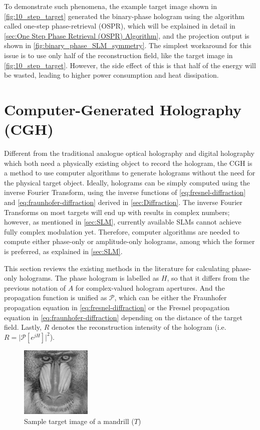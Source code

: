 To demonstrate such phenomena, the example target image shown in \cref{fig:10_step_target} generated the binary-phase hologram using the algorithm called one-step phase-retrieval (OSPR), which will be explained in detail in \cref{sec:One Step Phase Retrieval (OSPR) Algorithm}, and the projection output is shown in \cref{fig:binary_phase_SLM_symmetry}. The simplest workaround for this issue is to use only half of the reconstruction field, like the target image in \cref{fig:10_step_target}. However, the side effect of this is that half of the energy will be wasted, leading to higher power consumption and heat dissipation.



\newpage
\section{Computer-Generated Holography (CGH)}\label{sec:cgh}
Different from the traditional analogue optical holography and digital holography which both need a physically existing object to record the hologram, the CGH is a method to use computer algorithms to generate holograms without the need for the physical target object. Ideally, holograms can be simply computed using the inverse Fourier Transform, using the inverse functions of \cref{eq:fresnel-diffraction} and \cref{eq:fraunhofer-diffraction} derived in \cref{sec:Diffraction}. The inverse Fourier Transforms on most targets will end up with results in complex numbers; however, as mentioned in \cref{sec:SLM}, currently available SLMs cannot achieve fully complex modulation yet. Therefore, computer algorithms are needed to compute either phase-only or amplitude-only holograms, among which the former is preferred, as explained in \cref{sec:SLM}.

This section reviews the existing methods in the literature for calculating phase-only holograms. The phase hologram is labelled as $H$, so that it differs from the previous notation of $A$ for complex-valued hologram apertures. And the propagation function is unified as $\mathcal{P}$, which can be either the Fraunhofer propagation equation in \cref{eq:fresnel-diffraction} or the Fresnel propagation equation in \cref{eq:fraunhofer-diffraction} depending on the distance of the target field. Lastly, $R$ denotes the reconstruction intensity of the hologram (i.e. $R = \vert \mathcal{P}[e^{jH}] \vert ^2 $).

\begin{figure}[H]
  \centering
  \includegraphics[width=0.3\textwidth]{mandrill.png}
  \caption{Sample target image of a mandrill ($T$) \cite{MANDRILL_REF}}\label{fig:mandrill.png}
\end{figure}


